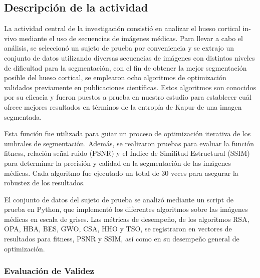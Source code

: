 \documentclass[conference]{IEEEtran}
\begin{document}

\subsection{Descripción de la actividad}
\noindent La actividad central de la investigación consistió en analizar el hueso cortical in-vivo mediante el uso de secuencias de imágenes médicas. Para llevar a cabo el análisis, se seleccionó un sujeto de prueba por conveniencia y se extrajo un conjunto de datos utilizando diversas secuencias de imágenes con distintos niveles de dificultad para la segmentación, con el fin de obtener la mejor segmentación posible del hueso cortical, se emplearon ocho algoritmos de optimización validados previamente en publicaciones científicas. Estos algoritmos son conocidos por su eficacia y fueron puestos a prueba en nuestro estudio para establecer cuál ofrece mejores resultados en términos de la entropía de Kapur de una imagen segmentada.

\noindent Esta función fue utilizada para guiar un proceso de optimización iterativa de los umbrales de segmentación. Además, se realizaron pruebas para evaluar la función fitness, relación señal-ruido (PSNR) y el Índice de Similitud Estructural (SSIM) para determinar la precisión y calidad en la segmentación de las imágenes médicas. Cada algoritmo fue ejecutado un total de 30 veces para asegurar la robustez de los resultados.

\noindent El conjunto de datos del sujeto de prueba se analizó mediante un script de prueba en Python, que implementó los diferentes algoritmos sobre las imágenes médicas en escala de grises. Las métricas de desempeño, de los algoritmos RSA, OPA, HBA, BES, GWO, CSA, HHO y TSO, se registraron en vectores de resultados para fitness, PSNR y SSIM, así como en su desempeño general de optimización. 

\subsubsection{Evaluación de Validez}
\end{document}
